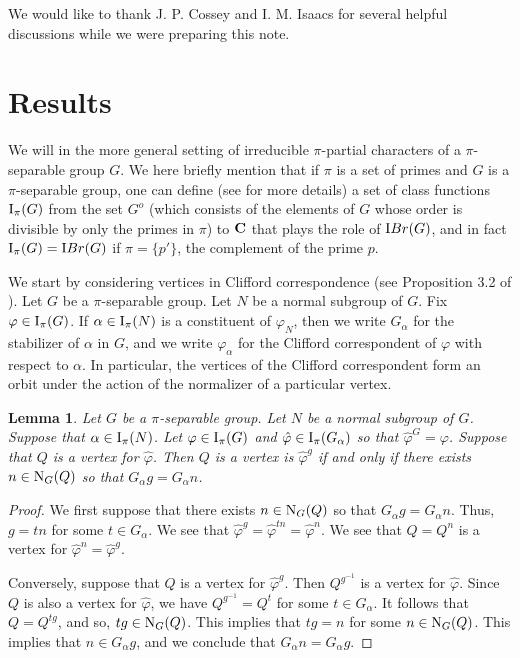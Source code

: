 \documentclass[12pt]{article}
\newtheorem{lemma}[theorem]{Lemma}
\def\ibr#1{{\textrm IBr} (#1)}
\def\norm#1#2{{\textrm N}_{#1} (#2)}
\def\I#1#2{{\textrm I}_{#1} (#2)}
\def\Ipi#1{\I {\pi}{#1}}
\def\phi{\varphi}
\begin{document}
We would like to thank J. P. Cossey and I. M. Isaacs for several
helpful discussions while we were preparing this note.

\section{Results}

We will in the more general setting of irreducible $\pi$-partial
characters of a $\pi$-separable group $G$.  We here briefly mention
that if $\pi$ is a set of primes and $G$ is a $\pi$-separable group,
one can define (see \cite{pipart} for more details) a set of class
functions $\Ipi G$ from the set $G^o$ (which consists of the
elements of $G$ whose order is divisible by only the primes in
$\pi$) to ${\bf C}$ that plays the role of $\ibr G$, and in fact
$\Ipi G = \ibr G$ if $\pi = \{ p' \}$, the complement of the prime
$p$.

%

We start by considering vertices in Clifford correspondence (see
Proposition 3.2 of \cite{Fong}).  Let $G$ be a $\pi$-separable
group. Let $N$ be a normal subgroup of $G$.   Fix $\phi \in \Ipi G$.
If $\alpha \in \Ipi N$ is a constituent of $\phi_N$, then we write
$G_\alpha$ for the stabilizer of $\alpha$ in $G$, and we write
$\phi_\alpha$ for the Clifford correspondent of $\phi$ with respect
to $\alpha$. In particular, the vertices of the Clifford
correspondent form an orbit under the action of the normalizer of a
particular vertex.

\begin{lemma}\label{cliff}
Let $G$ be a $\pi$-separable group.  Let $N$ be a normal subgroup of
$G$.  Suppose that $\alpha \in \Ipi N$.  Let $\phi \in \Ipi G$ and
$\hat\phi \in \Ipi {G_\alpha}$ so that $\hat\phi^G = \phi$.  Suppose
that $Q$ is a vertex for $\hat\phi$.  Then $Q$ is a vertex is
$\hat\phi^g$ if and only if there exists $n \in \norm GQ$ so that
$G_\alpha g = G_\alpha n$.
\end{lemma}

\begin{proof}
We first suppose that there exists $n \in \norm GQ$ so that
$G_\alpha g = G_\alpha n$.  Thus, $g = tn$ for some $t \in
G_\alpha$.  We see that $\hat\phi^g = \hat\phi^{tn} = \hat\phi^n$.
We see that $Q = Q^n$ is a vertex for $\hat\phi^n = \hat\phi^g$.

Conversely, suppose that $Q$ is a vertex for $\hat\phi^g$.  Then
$Q^{g^{-1}}$ is a vertex for $\hat\phi$.  Since $Q$ is also a vertex
for $\hat\phi$, we have $Q^{g^{-1}} = Q^t$ for some $t \in
G_\alpha$.  It follows that $Q = Q^{tg}$, and so, $tg \in \norm GQ$.
This implies that $tg = n$ for some $n \in \norm GQ$.  This implies
that $n \in G_\alpha g$, and we conclude that $G_\alpha n = G_\alpha
g$.
\end{proof}
\end{document}
